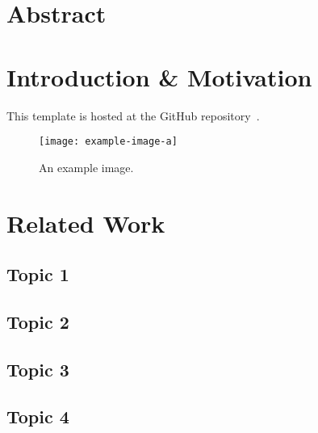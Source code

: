 
\section*{Abstract}

\lipsum[1]

\newpage

\section{Introduction \& Motivation}

This template is hosted at the GitHub repository~\cite{mizutani2021interactions-template}.

\lipsum[1]

\begin{figure}[ht!]
\texttt{[image: example-image-a]}
\caption{An example image.}
\label{fig:example}
\end{figure}

\lipsum

\section{Related Work}

\lipsum[1]


\subsection{Topic 1}

\lipsum[1-1]

\subsection{Topic 2}

\lipsum[1-1]

\subsection{Topic 3}

\lipsum[1-1]

\subsection{Topic 4}

